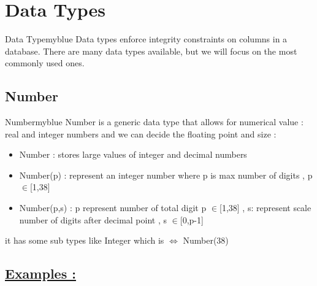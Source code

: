 \section{Data Types}


\begin{prettyBox}{Data Type}{myblue}
Data types enforce integrity constraints on columns in a database. There are many data types
available, but we will focus on the most commonly used ones.
\end{prettyBox}

\subsection{Number}

\begin{prettyBox}{Number}{myblue}
Number is a generic data type that allows for  numerical value : real and integer numbers 
and we can decide the floating point and size :
\begin{itemize}
    \item Number : stores large values of integer and decimal numbers 
    \item Number(p) : represent an integer number where p is max number of digits , p \(\in\)[1,38]
    \item Number(p,s) : p represent number of total digit p \(\in\)[1,38] , s: represent scale
number of digits after decimal point , s \(\in\)[0,p-1]
\end{itemize}

it has some sub types like Integer which is \(\Leftrightarrow\) Number(38)
\end{prettyBox}
\subsection*{\underline{Examples :}}

